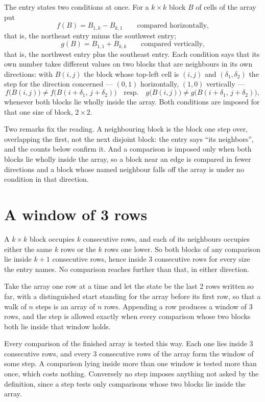 \documentclass[11pt,a4paper]{article}
\theoremstyle{plain}
\theoremstyle{definition}
\begin{document}
The entry states two conditions at once. For a $k\times k$ block $B$ of
cells of the array put
\[
f(B)=B_{1,k}-B_{k,1}\qquad\text{compared horizontally,}
\]
that is, the northeast entry minus the southwest entry;
\[
g(B)=B_{1,1}+B_{k,k}\qquad\text{compared vertically,}
\]
that is, the northwest entry plus the southeast entry.
Each condition says that its own number takes different values on two blocks that are
neighbours in its own directions: with $B(i,j)$ the block whose top-left cell is $(i,j)$ and
$(\delta_1,\delta_2)$ the step for the direction concerned --- $(0,1)$ horizontally, $(1,0)$ vertically ---
\[
f\bigl(B(i,j)\bigr)\neq f\bigl(B(i+\delta_1,\,j+\delta_2)\bigr)
\quad\text{resp.}\quad
g\bigl(B(i,j)\bigr)\neq g\bigl(B(i+\delta_1,\,j+\delta_2)\bigr),
\]
whenever both blocks lie wholly inside the array. Both conditions are imposed for that one size of block,
$2\times2$.

Two remarks fix the reading. A neighbouring block is the block one step over, overlapping the
first, not the next disjoint block: the entry says ``its neighbors'', and the counts below
confirm it. And a comparison is imposed only when both blocks lie wholly inside the array, so a
block near an edge is compared in fewer directions and a block whose named neighbour falls off
the array is under no condition in that direction.

\section{A window of 3 rows}

A $k\times k$ block occupies $k$ consecutive rows, and each of its neighbours occupies either
the same $k$ rows or the $k$ rows one lower. So both blocks of any comparison lie inside $k+1$
consecutive rows, hence inside $3$ consecutive rows for every size the entry names. No
comparison reaches further than that, in either direction.

Take the array one row at a time and let the state be the last 2 rows written so far, with a
distinguished start standing for the array before its first row, so that a walk of $n$ steps is
an array of $n$ rows. Appending a row produces a window of $3$ rows, and the step is
allowed exactly when every comparison whose two blocks both lie inside that window holds.

Every comparison of the finished array is tested this way. Each one lies inside $3$
consecutive rows, and every $3$ consecutive rows of the array form the window of some
step. A comparison lying inside more than one window is tested more than once, which costs
nothing. Conversely no step imposes anything not asked by the definition, since a step tests
only comparisons whose two blocks lie inside the array.
\end{document}
